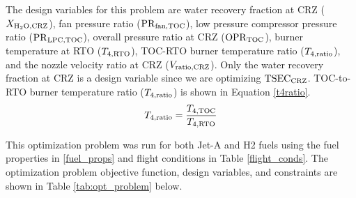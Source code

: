 \documentclass[conf]{new-aiaa}
\begin{document}
The design variables for this problem are water recovery fraction at CRZ ($X_{\rm{H_2O,CRZ}}$), fan pressure ratio ($\rm{PR}_{\rm{fan,TOC}}$), low pressure compressor pressure ratio ($\rm{PR}_{\rm{LPC,TOC}}$), overall pressure ratio at CRZ ($\rm{OPR}_{\rm{TOC}}$), burner temperature at RTO ($T_{4,\rm{RTO}}$), TOC-RTO burner temperature ratio ($T_{4,\rm{ratio}}$), and the nozzle velocity ratio at CRZ ($V_{\rm{ratio,CRZ}}$).
Only the water recovery fraction at CRZ is a design variable since we are optimizing $\rm{TSEC}_{\rm{CRZ}}$.
TOC-to-RTO burner temperature ratio ($T_{4,\rm{ratio}}$) is shown in Equation \eqref{t4ratio}.
\begin{equation}
    T_{4,\rm{ratio}} = \frac{T_{4,\rm{TOC}}}{T_{4,\rm{RTO}}}
    \label{t4ratio}
\end{equation}

This optimization problem was run for both Jet-A and H2 fuels using the fuel properties in \ref{fuel_props} and flight conditions in Table \ref{flight_conds}.
The optimization problem objective function, design variables, and constraints are shown in Table \ref{tab:opt_problem} below.
\end{document}
